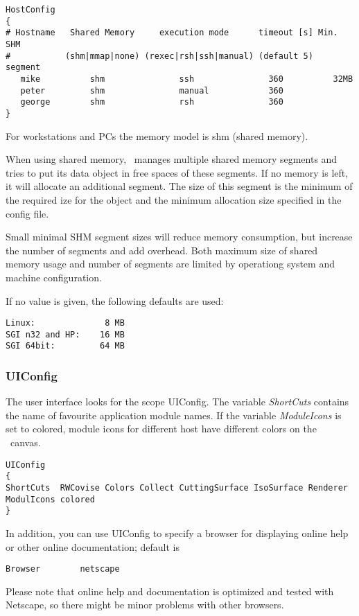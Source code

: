 \begin{verbatim}
HostConfig
{
# Hostname   Shared Memory     execution mode      timeout [s] Min. SHM
#           (shm|mmap|none) (rexec|rsh|ssh|manual) (default 5)  segment
   mike          shm               ssh               360          32MB
   peter         shm               manual            360
   george        shm               rsh               360
}
\end{verbatim}

For workstations and PCs the memory model is shm (shared memory).

When using shared memory, \covise\ manages multiple shared memory segments
and tries to put its data object in free spaces of these segments. If no
memory is left, it will allocate an additional segment. The size of this
segment is the minimum of the required ize for the object and the minimum
allocation size specified in the config file.

Small minimal SHM segment sizes will reduce memory consumption, but increase
the number of segments and add overhead. Both maximum size of shared memory
usage and number of segments are limited by operationg system and machine
configuration.

If no value is given, the following defaults are used:

\begin{verbatim}
Linux:              8 MB
SGI n32 and HP:    16 MB
SGI 64bit:         64 MB
\end{verbatim}

\subsubsection{UIConfig}
The user interface looks for the scope UIConfig. The variable {\it ShortCuts} contains the name
of favourite application module names. If the variable {\it ModuleIcons} is set to colored, module icons
for different host have different colors on the \mapeditor\ canvas.

\begin{verbatim}
UIConfig
{
ShortCuts  RWCovise Colors Collect CuttingSurface IsoSurface Renderer
ModulIcons colored
}
\end{verbatim}

In addition, you can use UIConfig to specify a browser for displaying online help or other
online documentation; default is  
\begin{verbatim}
Browser        netscape
\end{verbatim}
Please note that online help and documentation is optimized and tested with Netscape, so there
might be minor problems with other browsers.

